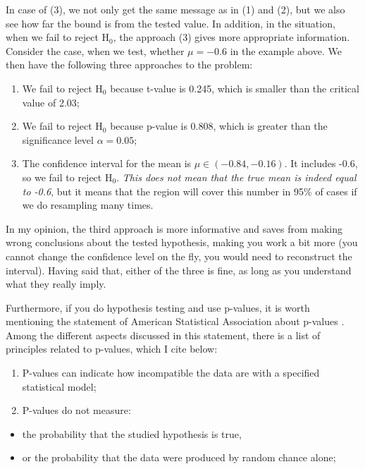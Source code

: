 \documentclass[
]{book}
\providecommand{\tightlist}{%
  \setlength{\itemsep}{0pt}\setlength{\parskip}{0pt}}
\theoremstyle{definition}
\theoremstyle{definition}
\theoremstyle{definition}
\theoremstyle{definition}
\theoremstyle{remark}
\begin{document}
In case of (3), we not only get the same message as in (1) and (2), but we also see how far the bound is from the tested value. In addition, in the situation, when we fail to reject \(\mathrm{H}_0\), the approach (3) gives more appropriate information. Consider the case, when we test, whether \(\mu=-0.6\) in the example above. We then have the following three approaches to the problem:

\begin{enumerate}
\def\labelenumi{\arabic{enumi}.}
\tightlist
\item
  We fail to reject \(\mathrm{H}_0\) because t-value is 0.245, which is smaller than the critical value of 2.03;
\item
  We fail to reject \(\mathrm{H}_0\) because p-value is 0.808, which is greater than the significance level \(\alpha=0.05\);
\item
  The confidence interval for the mean is \(\mu \in (-0.84, -0.16)\). It includes -0.6, so we fail to reject \(\mathrm{H}_0\). \emph{This does not mean that the true mean is indeed equal to -0.6}, but it means that the region will cover this number in 95\% of cases if we do resampling many times.
\end{enumerate}

In my opinion, the third approach is more informative and saves from making wrong conclusions about the tested hypothesis, making you work a bit more (you cannot change the confidence level on the fly, you would need to reconstruct the interval). Having said that, either of the three is fine, as long as you understand what they really imply.

Furthermore, if you do hypothesis testing and use p-values, it is worth mentioning the statement of American Statistical Association about p-values \citep{Wasserstein2016}. Among the different aspects discussed in this statement, there is a list of principles related to p-values, which I cite below:

\begin{enumerate}
\def\labelenumi{\arabic{enumi}.}
\tightlist
\item
  P-values can indicate how incompatible the data are with a specified statistical model;
\item
  P-values do not measure:
\end{enumerate}

\begin{itemize}
\tightlist
\item
  the probability that the studied hypothesis is true,
\item
  or the probability that the data were produced by random chance alone;
\end{itemize}
\end{document}
